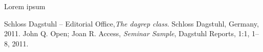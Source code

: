 
\license

Lorem ipsum

\begin{thebibliography}{0}
 Schloss Dagstuhl -- Editorial Office,\textsl{The dagrep class}. Schloss Dagstuhl, Germany, 2011.
 John Q. Open; Joan R. Access, \textsl{Seminar Sample}, Dagstuhl Reports, 1:1, 1--8, 2011.
\end{thebibliography}



